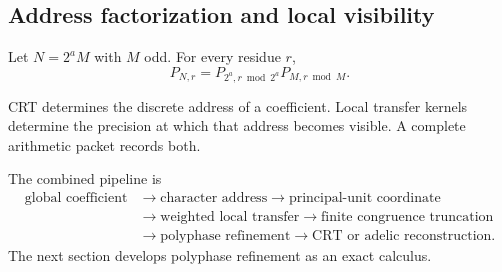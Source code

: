 \subsection{Address factorization and local visibility}
Let $N=2^aM$ with $M$ odd. For every residue $r$,
\[
 \boxed{P_{N,r}=P_{2^a,r\bmod2^a}P_{M,r\bmod M}.}
\]

\begin{principle}
CRT determines the discrete address of a coefficient. Local transfer kernels determine the precision at which that address becomes visible. A complete arithmetic packet records both.
\end{principle}

The combined pipeline is
\[
 \boxed{\begin{aligned}
 \text{global coefficient}&\longrightarrow\text{character address}\longrightarrow\text{principal-unit coordinate}\\
 &\longrightarrow\text{weighted local transfer}\longrightarrow\text{finite congruence truncation}\\
 &\longrightarrow\text{polyphase refinement}\longrightarrow\text{CRT or adelic reconstruction}.
 \end{aligned}}
\]
The next section develops polyphase refinement as an exact calculus.
